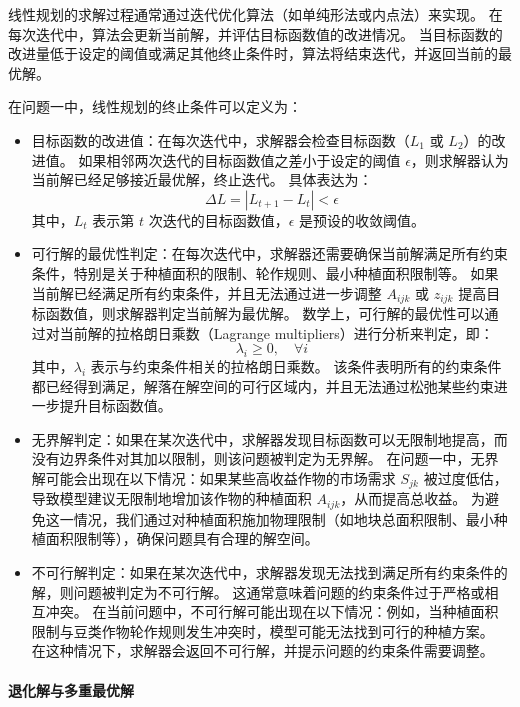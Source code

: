 \documentclass[12pt,a4paper]{nmmcm}
\begin{document}
线性规划的求解过程通常通过迭代优化算法（如单纯形法或内点法）来实现。
在每次迭代中，算法会更新当前解，并评估目标函数值的改进情况。
当目标函数的改进量低于设定的阈值或满足其他终止条件时，算法将结束迭代，并返回当前的最优解。


在问题一中，线性规划的终止条件可以定义为：
\begin{itemize}
  \item 目标函数的改进值：在每次迭代中，求解器会检查目标函数（$L_1$ 或 $L_2$）的改进值。
        如果相邻两次迭代的目标函数值之差小于设定的阈值 $\epsilon$，则求解器认为当前解已经足够接近最优解，终止迭代。
        具体表达为：
        \[
          \Delta L = |L_{t+1} - L_t| < \epsilon
        \]
        其中，$L_t$ 表示第 $t$ 次迭代的目标函数值，$\epsilon$ 是预设的收敛阈值。


  \item 可行解的最优性判定：在每次迭代中，求解器还需要确保当前解满足所有约束条件，特别是关于种植面积的限制、轮作规则、最小种植面积限制等。
        如果当前解已经满足所有约束条件，并且无法通过进一步调整 $A_{ijk}$ 或 $z_{ijk}$ 提高目标函数值，则求解器判定当前解为最优解。
        数学上，可行解的最优性可以通过对当前解的拉格朗日乘数（Lagrange multipliers）进行分析来判定，即：
        \[
          \lambda_i \geq 0, \quad \forall i
        \]
        其中，$\lambda_i$ 表示与约束条件相关的拉格朗日乘数。
        该条件表明所有的约束条件都已经得到满足，解落在解空间的可行区域内，并且无法通过松弛某些约束进一步提升目标函数值。


  \item 无界解判定：如果在某次迭代中，求解器发现目标函数可以无限制地提高，而没有边界条件对其加以限制，则该问题被判定为无界解。
        在问题一中，无界解可能会出现在以下情况：如果某些高收益作物的市场需求 $S_{jk}$ 被过度低估，导致模型建议无限制地增加该作物的种植面积 $A_{ijk}$，从而提高总收益。
        为避免这一情况，我们通过对种植面积施加物理限制（如地块总面积限制、最小种植面积限制等），确保问题具有合理的解空间。


  \item 不可行解判定：如果在某次迭代中，求解器发现无法找到满足所有约束条件的解，则问题被判定为不可行解。
        这通常意味着问题的约束条件过于严格或相互冲突。
        在当前问题中，不可行解可能出现在以下情况：例如，当种植面积限制与豆类作物轮作规则发生冲突时，模型可能无法找到可行的种植方案。
        在这种情况下，求解器会返回不可行解，并提示问题的约束条件需要调整。

\end{itemize}

\paragraph{退化解与多重最优解}
\end{document}
